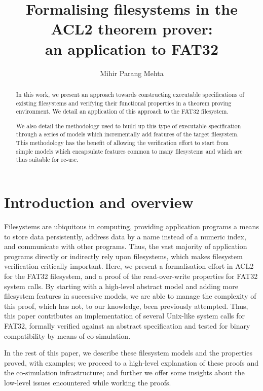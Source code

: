 \documentclass[submission,copyright,creativecommons]{eptcs}
\title{Formalising filesystems in the ACL2 theorem prover:\\ an
  application to FAT32}
\author{Mihir Parang Mehta
\institute{Department of Computer Science\\
University of Texas at Austin\\
Austin, TX, USA}
\email{mihir@cs.utexas.edu}}
\begin{document}
\maketitle

\begin{abstract}
In this work, we present an
approach towards constructing executable specifications of existing
filesystems and verifying their functional properties in a theorem
proving environment. We detail an application of this approach to the
FAT32 filesystem.

We also detail the methodology used to build up this type of
executable specification through a series of models which
incrementally add features of the target filesystem. This methodology
has the benefit of allowing the verification effort to start from
simple models which encapsulate features common to many filesystems
and which are thus suitable for re-use.
\end{abstract}

\section{Introduction and overview}

Filesystems are ubiquitous in computing, providing application
programs a means to store data persistently, address data by a name
instead of a numeric index, and communicate with other programs.
Thus, the vast majority of application programs
directly or indirectly rely upon filesystems, which makes filesystem
verification critically important. Here, we present a
formalisation effort in ACL2 for the FAT32 filesystem, and a proof of
the read-over-write properties for FAT32 system calls. By starting
with a high-level abstract model and adding more filesystem features
in successive models, we are able to manage the complexity of this
proof, which has not, to our knowledge, been previously
attempted. Thus, this paper contributes an implementation of several
Unix-like system calls for FAT32, formally verified against an
abstract specification and tested for binary compatibility by means of
co-simulation.

In the rest of this paper, we describe these filesystem
models and the properties proved, with examples; we proceed to a
high-level explanation of these proofs and the co-simulation
infrastructure; and further we offer some insights about the low-level
issues encountered while working the proofs.
\end{document}

